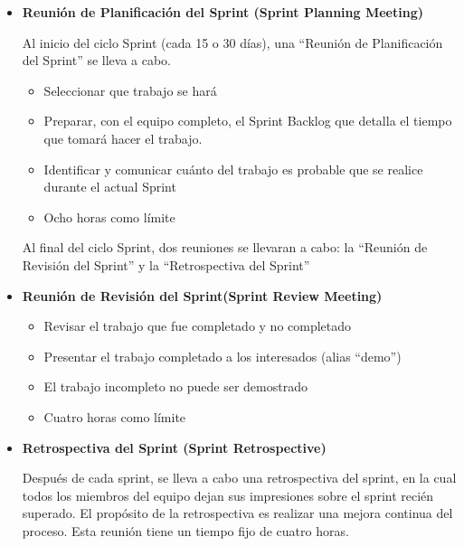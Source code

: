{\begin{itemize}
    \textbf{La importancia del Stand up meeting}
    \begin{itemize}
		\item Si estas reuniones diarias son cortas, concisas y llenas de información, los miembros del equipo las apreciarán más, y no tratarán de evitarlas como lo hacen cuando se trata de reuniones tradicionales de una vez a la semana y que además duran más de tres horas.
        \item Guía al equipo por el camino hacia una mejor colaboración, fomentando a los miembros del equipo para que provean actualizaciones entre ellos, y no así al administrador del proyecto o facilitador de la reunión. Haciendo esto, el equipo comienza a ver a la “Standup Meeting” como una herramienta para coordinar su trabajo y mantenerse al tanto de lo que hacen los otros, en vez de ser un mal necesario para contestar a la pregunta ¿ya terminaste?.
	\end{itemize}
    
	\item \textbf{ Reunión de Planificación del Sprint (Sprint Planning Meeting)}

Al inicio del ciclo Sprint (cada 15 o 30 días), una “Reunión de Planificación del Sprint” se lleva a cabo.
	\begin{itemize}
	    \item Seleccionar que trabajo se hará
		\item    Preparar, con el equipo completo, el Sprint Backlog que detalla el tiempo que tomará hacer el trabajo.
		\item    Identificar y comunicar cuánto del trabajo es probable que se realice durante el actual Sprint
		\item    Ocho horas como límite
	\end{itemize}
Al final del ciclo Sprint, dos reuniones se llevaran a cabo: la “Reunión de Revisión del Sprint” y la “Retrospectiva del Sprint”
	\item \textbf{Reunión de Revisión del Sprint(Sprint Review Meeting)}
		\begin{itemize}
			\item    Revisar el trabajo que fue completado y no completado
			\item    Presentar el trabajo completado a los interesados (alias “demo”)
			\item    El trabajo incompleto no puede ser demostrado
			\item    Cuatro horas como límite
		\end{itemize}

	\item \textbf{Retrospectiva del Sprint (Sprint Retrospective)}

Después de cada sprint, se lleva a cabo una retrospectiva del sprint, en la cual todos los miembros del equipo dejan sus impresiones sobre el sprint recién superado. El propósito de la retrospectiva es realizar una mejora continua del proceso. Esta reunión tiene un tiempo fijo de cuatro horas.

	\end{itemize}
}
